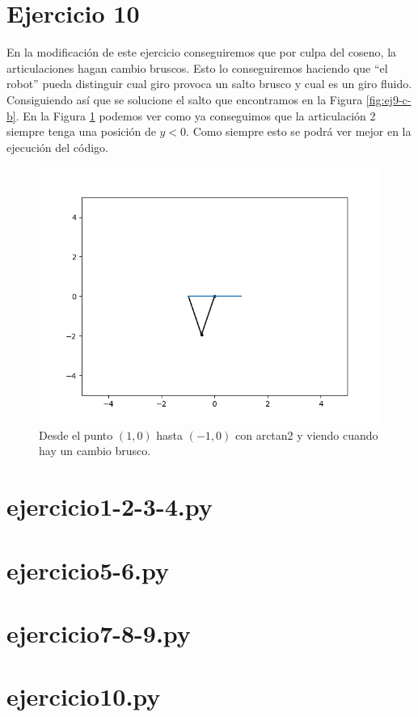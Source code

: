 \documentclass[12pt,a4paper]{report}
\begin{document}
\section*{Ejercicio  10}
En la modificación de este ejercicio conseguiremos que por culpa del coseno, la articulaciones hagan cambio bruscos. Esto lo conseguiremos haciendo que ``el robot'' pueda distinguir cual giro provoca un salto brusco y cual es un giro fluido. Consiguiendo así que se solucione el salto que encontramos en la Figura \ref{fig:ej9-c-b}. En la Figura \ref{fig:ej10-c} podemos ver como ya conseguimos que la articulación 2 siempre tenga una posición de $y<0$. Como siempre esto se podrá ver mejor en la ejecución del código. 
\begin{figure}[H]
	\centering
	\includegraphics[width=0.7\linewidth]{img/Tercer_apartado-Eje_10.png}
	\caption{Desde el punto $(1,0)$ hasta $(-1,0)$ con arctan2 y viendo cuando hay un cambio brusco.}
	\label{fig:ej10-c}
\end{figure}
\begin{appendices}
	\section*{ejercicio1-2-3-4.py}
	
	\section*{ejercicio5-6.py}
	
	\section*{ejercicio7-8-9.py}
	
	\section*{ejercicio10.py}
	
\end{appendices}
\end{document}
